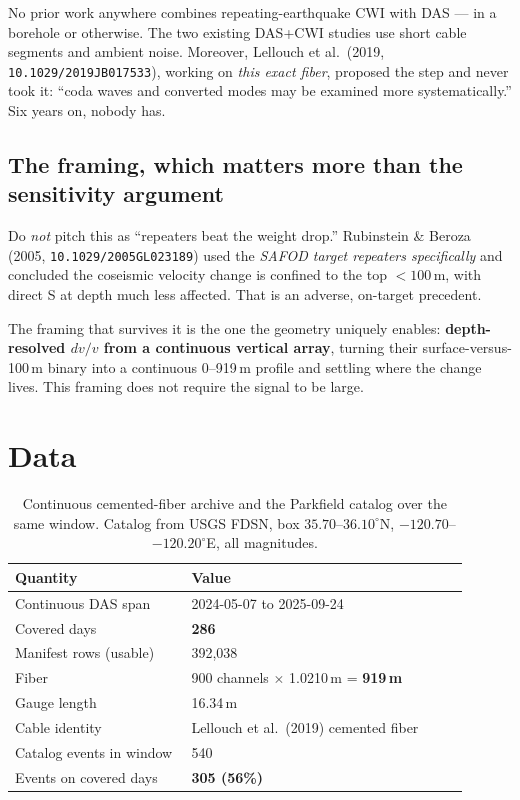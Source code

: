 \documentclass[11pt]{article}
\begin{document}
No prior work anywhere combines repeating-earthquake CWI with DAS --- in a
borehole or otherwise. The two existing DAS+CWI studies use short cable segments
and ambient noise. Moreover, Lellouch et al.\ (2019,
\texttt{10.1029/2019JB017533}), working on \emph{this exact fiber}, proposed the
step and never took it: ``coda waves and converted modes may be examined more
systematically.'' Six years on, nobody has.

\subsection*{The framing, which matters more than the sensitivity argument}

Do \emph{not} pitch this as ``repeaters beat the weight drop.'' Rubinstein \&
Beroza (2005, \texttt{10.1029/2005GL023189}) used the \emph{SAFOD target
repeaters specifically} and concluded the coseismic velocity change is confined
to the top $<100$\,m, with direct S at depth much less affected. That is an
adverse, on-target precedent.

The framing that survives it is the one the geometry uniquely enables:
\textbf{depth-resolved $dv/v$ from a continuous vertical array}, turning their
surface-versus-100\,m binary into a continuous 0--919\,m profile and settling
where the change lives. This framing does not require the signal to be large.

\section{Data}

\begin{table}[H]
\centering
\begin{tabular}{p{0.35\linewidth}p{0.55\linewidth}}
\toprule
Quantity & Value \\
\midrule
Continuous DAS span & 2024-05-07 to 2025-09-24 \\
Covered days & \textbf{286} \\
Manifest rows (usable) & 392{,}038 \\
Fiber & 900 channels $\times$ 1.0210\,m = \textbf{919\,m} \\
Gauge length & 16.34\,m \\
Cable identity & Lellouch et al.\ (2019) cemented fiber \\
Catalog events in window & 540 \\
Events on covered days & \textbf{305 (56\%)} \\
\bottomrule
\end{tabular}
\caption{Continuous cemented-fiber archive and the Parkfield catalog over the
same window. Catalog from USGS FDSN, box $35.70$--$36.10^\circ$N,
$-120.70$--$-120.20^\circ$E, all magnitudes.}
\end{table}
\end{document}
